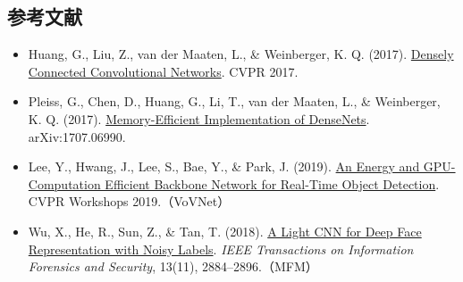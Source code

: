 \FloatBarrier
{}
\hypertarget{ux53c2ux8003ux6587ux732e-15}{%
\subsection{参考文献}\label{ux53c2ux8003ux6587ux732e-15}}

\vspace{0.25em}
\begin{itemize}
\tightlist
\item
  Huang, G., Liu, Z., van der Maaten, L., \& Weinberger, K. Q. (2017). \href{https://arxiv.org/abs/1608.06993}{Densely Connected Convolutional Networks}. CVPR 2017.
\item
  Pleiss, G., Chen, D., Huang, G., Li, T., van der Maaten, L., \& Weinberger, K. Q. (2017). \href{https://arxiv.org/abs/1707.06990}{Memory-Efficient Implementation of DenseNets}. arXiv:1707.06990.
\item
  Lee, Y., Hwang, J., Lee, S., Bae, Y., \& Park, J. (2019). \href{https://openaccess.thecvf.com/content_CVPRW_2019/html/CEFRL/Lee_An_Energy_and_GPU-Computation_Efficient_Backbone_Network_for_Real-Time_Object_CVPRW_2019_paper.html}{An Energy and GPU-Computation Efficient Backbone Network for Real-Time Object Detection}. CVPR Workshops 2019.（VoVNet）
\item
  Wu, X., He, R., Sun, Z., \& Tan, T. (2018). \href{https://arxiv.org/abs/1511.02683}{A Light CNN for Deep Face Representation with Noisy Labels}. \emph{IEEE Transactions on Information Forensics and Security}, 13(11), 2884--2896.（MFM）
\end{itemize}

\clearpage
